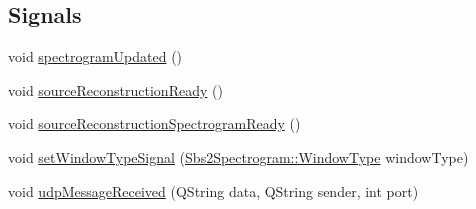 \subsection*{Signals}
\begin{DoxyCompactItemize}
\item 
void \hyperlink{classSbs2DataHandler_a6b044b68ab3c078889461095ae68b6a6}{spectrogram\-Updated} ()
\item 
void \hyperlink{classSbs2DataHandler_acfa19e08cc3317e782b945cd7d3adcbc}{source\-Reconstruction\-Ready} ()
\item 
void \hyperlink{classSbs2DataHandler_a5b443bf31daf7f1c235bf5503b11ee97}{source\-Reconstruction\-Spectrogram\-Ready} ()
\item 
void \hyperlink{classSbs2DataHandler_a1af8becf1c88098783238e1d4d9fa8f2}{set\-Window\-Type\-Signal} (\hyperlink{classSbs2Spectrogram_a22265347883488b8385c83b67882d915}{Sbs2\-Spectrogram\-::\-Window\-Type} window\-Type)
\item 
void \hyperlink{classSbs2DataHandler_a504ee9abc91fb5b7cec62c1eaedc6d92}{udp\-Message\-Received} (Q\-String data, Q\-String sender, int port)
\end{DoxyCompactItemize}
